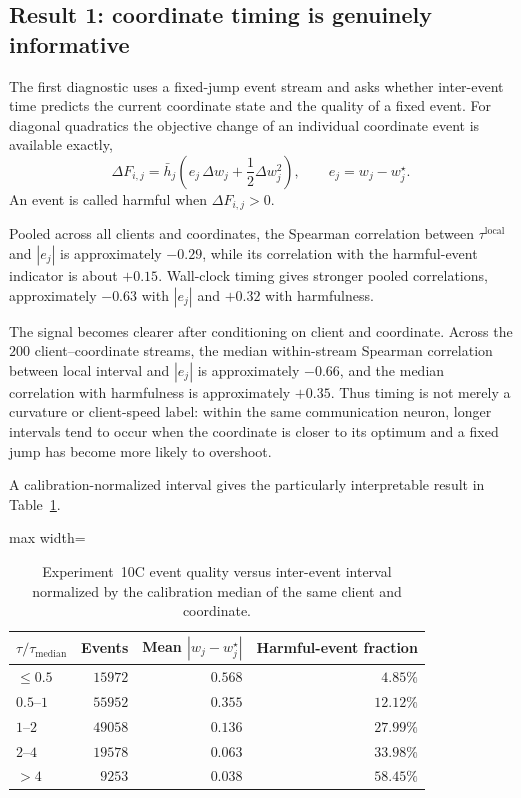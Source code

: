 \subsection{Result 1: coordinate timing is genuinely informative}

The first diagnostic uses a fixed-jump event stream and asks whether inter-event time predicts the current coordinate state and the quality of a fixed event. For diagonal quadratics the objective change of an individual coordinate event is available exactly,
\begin{equation}
  \Delta F_{i,j}
  =\bar h_j\left(e_j\,\Delta w_j+\frac{1}{2}\Delta w_j^2\right),
  \qquad e_j=w_j-w_j^\star.
\end{equation}
An event is called harmful when $\Delta F_{i,j}>0$.

Pooled across all clients and coordinates, the Spearman correlation between $\tau^{\mathrm{local}}$ and $|e_j|$ is approximately $-0.29$, while its correlation with the harmful-event indicator is about $+0.15$. Wall-clock timing gives stronger pooled correlations, approximately $-0.63$ with $|e_j|$ and $+0.32$ with harmfulness.

The signal becomes clearer after conditioning on client and coordinate. Across the $200$ client--coordinate streams, the median within-stream Spearman correlation between local interval and $|e_j|$ is approximately $-0.66$, and the median correlation with harmfulness is approximately $+0.35$. Thus timing is not merely a curvature or client-speed label: within the same communication neuron, longer intervals tend to occur when the coordinate is closer to its optimum and a fixed jump has become more likely to overshoot.

A calibration-normalized interval gives the particularly interpretable result in Table~\ref{tab:exp10c_timing_quality}.

\begin{table}[ht]
  \centering
  \small
  \caption{Experiment~10C event quality versus inter-event interval normalized by the calibration median of the same client and coordinate.}
  \label{tab:exp10c_timing_quality}
  \begin{adjustbox}{max width=\textwidth}
\begin{tabular}{lrrr}
    \toprule
    $\tau/\tau_{\mathrm{median}}$ & Events & Mean $|w_j-w_j^\star|$ & Harmful-event fraction \\
    \midrule
    $\leq0.5$ & $15972$ & $0.568$ & $4.85\%$ \\
    $0.5$--$1$ & $55952$ & $0.355$ & $12.12\%$ \\
    $1$--$2$ & $49058$ & $0.136$ & $27.99\%$ \\
    $2$--$4$ & $19578$ & $0.063$ & $33.98\%$ \\
    $>4$ & $9253$ & $0.038$ & $58.45\%$ \\
    \bottomrule
  \end{tabular}
\end{adjustbox}
\end{table}

